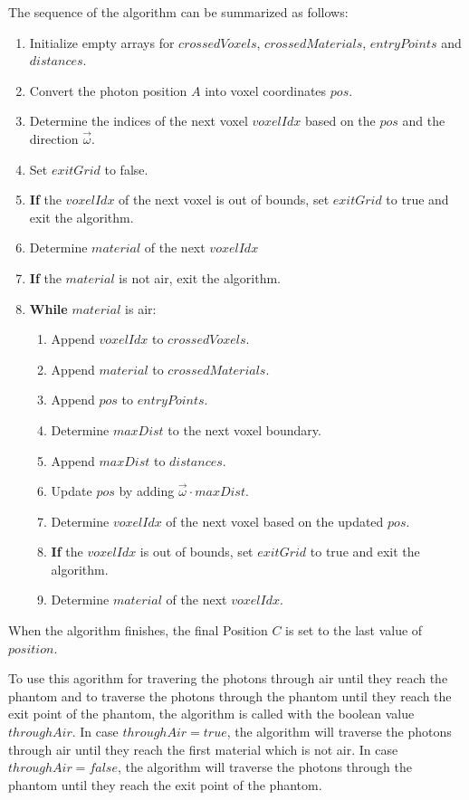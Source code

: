The sequence of the algorithm can be summarized as follows:
\begin{enumerate}[label=\Roman*.]
    \item Initialize empty arrays for $crossedVoxels$, $crossedMaterials$, $entryPoints$ and $distances$.
    \item Convert the photon position $A$ into voxel coordinates $pos$.
    \item Determine the indices of the next voxel $voxelIdx$ based on the
    $pos$ and the direction $\vec{\omega}$.
    \item Set $exitGrid$ to false.
    \item \textbf{If} the $voxelIdx$ of the next voxel is out of bounds, set $exitGrid$ to true and exit the algorithm.
    \item Determine $material$ of the next $voxelIdx$
    \item \textbf{If} the $material$ is not air, exit the algorithm.
    \item \textbf{While} $material$ is air:
        \begin{enumerate}[label=\arabic*.]
            \item Append $voxelIdx$ to $crossedVoxels$.
            \item Append $material$ to $crossedMaterials$.
            \item Append $pos$ to $entryPoints$.
            \item Determine $maxDist$ to the next voxel boundary.
            \item Append $maxDist$ to $distances$.
            \item Update $pos$ by adding $\vec{\omega} \cdot maxDist$.
            \item Determine $voxelIdx$ of the next voxel based on the updated $pos$.
            \item \textbf{If} the $voxelIdx$ is out of bounds, set $exitGrid$ to true and exit the algorithm.
            \item Determine $material$ of the next $voxelIdx$.
        \end{enumerate}
\end{enumerate}

When the algorithm finishes, the final Position $C$ is set to the last value of
$position$.

To use this agorithm for travering the photons through air until they reach the phantom and to traverse the photons through the phantom until they reach the exit point of the phantom, the algorithm is called with the boolean value $throughAir$. In case $throughAir=true$, the algorithm will traverse the photons through air until they reach the first material which is not air. In case $throughAir=false$, the algorithm will traverse the photons through the phantom until they reach the exit point of the phantom.

